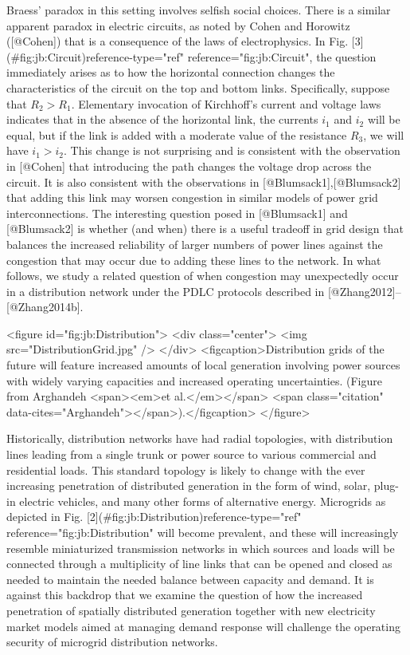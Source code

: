 Braess' paradox in this setting involves selfish social choices. There is a similar apparent paradox in electric circuits, as noted by Cohen and Horowitz ([@Cohen]) that is a consequence of the laws of electrophysics. In Fig. [3](#fig:jb:Circuit){reference-type="ref" reference="fig:jb:Circuit"}, the question immediately arises as to how the horizontal connection changes the characteristics of the circuit on the top and bottom links. Specifically, suppose that $R_2>R_1$. Elementary invocation of Kirchhoff's current and voltage laws indicates that in the absence of the horizontal link, the currents $i_1$ and $i_2$ will be equal, but if the link is added with a moderate value of the resistance $R_3$, we will have $i_1>i_2$. This change is not surprising and is consistent with the observation in [@Cohen] that introducing the path changes the voltage drop across the circuit. It is also consistent with the observations in [@Blumsack1],[@Blumsack2] that adding this link may worsen congestion in similar models of power grid interconnections. The interesting question posed in [@Blumsack1] and [@Blumsack2] is whether (and when) there is a useful tradeoff in grid design that balances the increased reliability of larger numbers of power lines against the congestion that may occur due to adding these lines to the network. In what follows, we study a related question of when congestion may unexpectedly occur in a distribution network under the PDLC protocols described in [@Zhang2012]--[@Zhang2014b].

<figure id="fig:jb:Distribution"> <div class="center"> <img src="DistributionGrid.jpg" /> </div> <figcaption>Distribution grids of the future will feature increased amounts of local generation involving power sources with widely varying capacities and increased operating uncertainties. (Figure from Arghandeh <span><em>et al.</em></span> <span class="citation" data-cites="Arghandeh"></span>).</figcaption> </figure>

Historically, distribution networks have had radial topologies, with distribution lines leading from a single trunk or power source to various commercial and residential loads. This standard topology is likely to change with the ever increasing penetration of distributed generation in the form of wind, solar, plug-in electric vehicles, and many other forms of alternative energy. Microgrids as depicted in Fig. [2](#fig:jb:Distribution){reference-type="ref" reference="fig:jb:Distribution"} will become prevalent, and these will increasingly resemble miniaturized transmission networks in which sources and loads will be connected through a multiplicity of line links that can be opened and closed as needed to maintain the needed balance between capacity and demand. It is against this backdrop that we examine the question of how the increased penetration of spatially distributed generation together with new electricity market models aimed at managing demand response will challenge the operating security of microgrid distribution networks.

